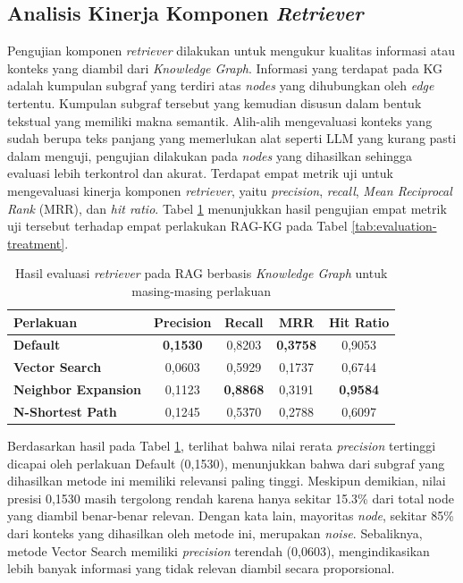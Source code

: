 \subsection{Analisis Kinerja Komponen \textit{Retriever}}

Pengujian komponen \textit{retriever} dilakukan untuk mengukur kualitas informasi atau konteks yang diambil dari \textit{Knowledge Graph}.
Informasi yang terdapat pada KG adalah kumpulan subgraf yang terdiri atas \textit{nodes} yang dihubungkan oleh \textit{edge} tertentu.
Kumpulan subgraf tersebut yang kemudian disusun dalam bentuk tekstual yang memiliki makna semantik.
Alih-alih mengevaluasi konteks yang sudah berupa teks panjang yang memerlukan alat seperti LLM yang kurang pasti dalam menguji, pengujian dilakukan pada \textit{nodes} yang dihasilkan sehingga evaluasi lebih terkontrol dan akurat.
Terdapat empat metrik uji untuk mengevaluasi kinerja komponen \textit{retriever}, yaitu \textit{precision}, \textit{recall}, \textit{Mean Reciprocal Rank} (MRR), dan \textit{hit ratio}.
Tabel \ref{tab:retrieval-evaluation-result} menunjukkan hasil pengujian empat metrik uji tersebut terhadap empat perlakukan RAG-KG pada Tabel \ref{tab:evaluation-treatment}.

\begin{table}[H]
	\centering
	\caption{Hasil evaluasi \textit{retriever} pada RAG berbasis \textit{Knowledge Graph} untuk masing-masing perlakuan}
	\label{tab:retrieval-evaluation-result}
	\begin{tabular}{|l|c|c|c|c|}
		\hline
		\textbf{Perlakuan}          & \textbf{Precision} & \textbf{Recall} & \textbf{MRR}    & \textbf{Hit Ratio} \\
		\hline \hline
		\textbf{Default}            & \textbf{0,1530}    & 0,8203          & \textbf{0,3758} & 0,9053             \\
		\hline
		\textbf{Vector Search}      & 0,0603             & 0,5929          & 0,1737          & 0,6744             \\
		\hline
		\textbf{Neighbor Expansion} & 0,1123             & \textbf{0,8868} & 0,3191          & \textbf{0,9584}    \\
		\hline
		\textbf{N-Shortest Path}    & 0,1245             & 0,5370          & 0,2788          & 0,6097             \\
		\hline
	\end{tabular}
\end{table}
\pagebreak

Berdasarkan hasil pada Tabel \ref{tab:retrieval-evaluation-result}, terlihat bahwa nilai rerata \textit{precision} tertinggi dicapai oleh perlakuan Default (0,1530), menunjukkan bahwa dari subgraf yang dihasilkan metode ini memiliki relevansi paling tinggi.
Meskipun demikian, nilai presisi 0,1530 masih tergolong rendah karena hanya sekitar 15.3\% dari total node yang diambil benar-benar relevan.
Dengan kata lain, mayoritas \textit{node}, sekitar 85\% dari konteks yang dihasilkan oleh metode ini, merupakan \textit{noise}.
Sebaliknya, metode Vector Search memiliki \textit{precision} terendah (0,0603), mengindikasikan lebih banyak informasi yang tidak relevan diambil secara proporsional.

